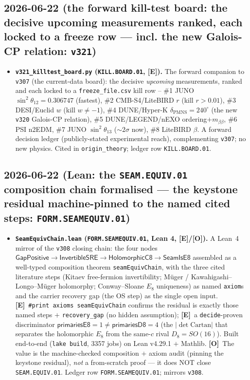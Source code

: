 \documentclass[11pt]{article}
\providecommand{\mE}{\textbf{[E]}}\providecommand{\mC}{\textbf{[C]}}
\providecommand{\mO}{\textbf{[O]}}\providecommand{\mX}{\textbf{[X]}}
\begin{document}
\subsection*{2026-06-22 (the forward kill-test board: the decisive upcoming measurements ranked, each locked to a freeze row --- incl. the new Galois-CP relation: \texttt{v321})}
\begin{itemize}
\item \textbf{\texttt{v321\_killtest\_board.py} (\texttt{KILL.BOARD.01}, \mE).} The forward companion to \texttt{v307}
  (the current-data board): the decisive \emph{upcoming} measurements, ranked and each locked to a
  \texttt{freeze\_file.csv} kill row -- \#1 JUNO $\sin^2\theta_{12}{=}0.306747$ (fastest), \#2 CMB-S4/LiteBIRD $r$
  (kill $r{>}0.01$), \#3 DESI/Euclid $w$ (kill $w{\ne}{-}1$), \#4 DUNE/Hyper-K $\delta_{\mathrm{PMNS}}{=}240^\circ$
  (the new \texttt{v320} Galois-CP relation), \#5 DUNE/LEGEND/nEXO ordering$+m_{\beta\beta}$, \#6 PSI n2EDM, \#7 JUNO
  $\sin^2\theta_{13}$ ($\sim2\sigma$ now), \#8 LiteBIRD $\beta$. A forward decision ledger (publicly-stated
  experimental reach), complementing \texttt{v307}; no new physics. Cited in \texttt{origin\_theory}; ledger row
  \texttt{KILL.BOARD.01}.
\end{itemize}

\subsection*{2026-06-22 (Lean: the \texttt{SEAM.EQUIV.01} composition chain formalised --- the keystone residual machine-pinned to the named cited steps: \texttt{FORM.SEAMEQUIV.01})}
\begin{itemize}
\item \textbf{\texttt{SeamEquivChain.lean} (\texttt{FORM.SEAMEQUIV.01}, Lean 4, \mE/\mO).} A Lean~4 mirror of the
  \texttt{v308} closing chain: the four nodes $\textsf{GapPositive}\to\textsf{InvertibleSRE}\to\textsf{HolomorphicC8}
  \to\textsf{SeamIsE8}$ assembled as a well-typed composition theorem \texttt{seamEquivChain}, with the three cited
  literature steps (Kitaev free-fermion invertibility; M\"uger / Kawahigashi--Longo--M\"uger holomorphy;
  Conway--Sloane $E_8$ uniqueness) as named \texttt{axiom}s and the carrier recovery gap (the OS step) as the single
  open input. \mE\ \texttt{\#print axioms seamEquivChain} confirms the residual is exactly those named steps $+$
  \texttt{recovery\_gap} (no hidden assumption); \mE\ a \texttt{decide}-proven discriminator
  $\textsf{primariesE8}=1\ne\textsf{primariesD8}=4$ (the $|\det\mathrm{Cartan}|$ that separates the holomorphic
  $E_8$ from the same-$c$ rival $D_8{=}SO(16)$). Built end-to-end (\texttt{lake build}, 3357 jobs) on Lean
  v4.29.1 $+$ Mathlib. \mO\ The value is the machine-checked composition $+$ axiom audit (pinning the keystone
  residual), \emph{not} a from-scratch proof --- it does NOT close \texttt{SEAM.EQUIV.01}. Ledger row
  \texttt{FORM.SEAMEQUIV.01}; mirrors \texttt{v308}.
\end{itemize}
\end{document}
